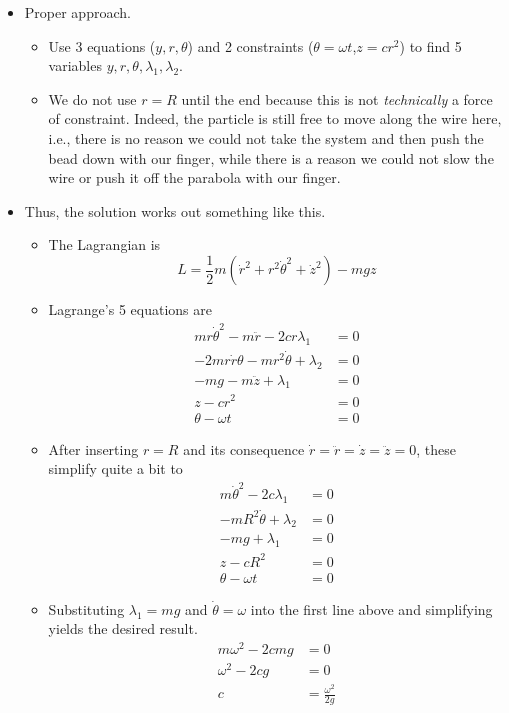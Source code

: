 \documentclass[../notes.tex]{subfiles}
\begin{document}
\begin{itemize}
\begin{itemize}
        \item Proper approach.
        \begin{itemize}
            \item Use 3 equations ($y,r,\theta$) and 2 constraints ($\theta=\omega t$,$z=cr^2$) to find 5 variables $y,r,\theta,\lambda_1,\lambda_2$.
            \item We do not use $r=R$ until the end because this is not \emph{technically} a force of constraint. Indeed, the particle is still free to move along the wire here, i.e., there is no reason we could not take the system and then push the bead down with our finger, while there is a reason we could not slow the wire or push it off the parabola with our finger.
        \end{itemize}
        \item Thus, the solution works out something like this.
        \begin{itemize}
            \item The Lagrangian is
            \begin{equation*}
                L = \frac{1}{2}m(\dot{r}^2+r^2\dot{\theta}^2+\dot{z}^2)-mgz
            \end{equation*}
            \item Lagrange's 5 equations are
            \begin{align*}
                mr\dot{\theta}^2-m\ddot{r}-2cr\lambda_1 &= 0\\
                -2mr\dot{r}\theta-mr^2\dot{\theta}+\lambda_2 &= 0\\
                -mg-m\ddot{z}+\lambda_1 &= 0\\
                z-cr^2 &= 0\\
                \theta-\omega t &= 0
            \end{align*}
            \item After inserting $r=R$ and its consequence $\dot{r}=\ddot{r}=\dot{z}=\ddot{z}=0$, these simplify quite a bit to
            \begin{align*}
                m\dot{\theta}^2-2c\lambda_1 &= 0\\
                -mR^2\dot{\theta}+\lambda_2 &= 0\\
                -mg+\lambda_1 &= 0\\
                z-cR^2 &= 0\\
                \theta-\omega t &= 0
            \end{align*}
            \item Substituting $\lambda_1=mg$ and $\dot{\theta}=\omega$ into the first line above and simplifying yields the desired result.
            \begin{align*}
                m\omega^2-2cmg &= 0\\
                \omega^2-2cg &= 0\\
                c &= \frac{\omega^2}{2g}
            \end{align*}
        \end{itemize}
    \end{itemize}
\end{itemize}
\end{document}
